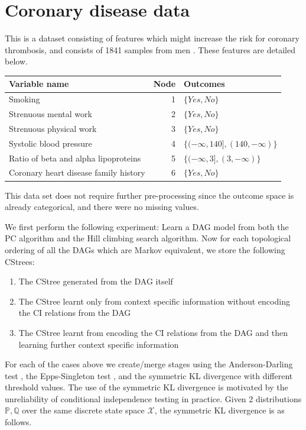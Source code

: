 \documentclass{tufte-book}
\begin{document}
 \newpage 
\section{Coronary disease data}
\label{sec:orgb663ff2}

This is a dataset consisting of features which might increase the risk for coronary thrombosis, and consists of 1841 samples from men \cite{reinis-1981-progn-signif}.  These features are detailed below.
\begin{center}
\begin{tabular}{l|r|l}
\hline
Variable name & Node & Outcomes\\
\hline
Smoking & 1 & \(\{ Yes,No \}\)\\
Strenuous mental work & 2 & \(\{ Yes,No \}\)\\
Strenuous physical work & 3 & \(\{ Yes,No \}\)\\
Systolic blood pressure & 4 & \(\{(-\infty,140],(140,-\infty)\}\)\\
Ratio of beta and alpha lipoproteins & 5 & \(\{(-\infty,3],(3,-\infty)\}\)\\
Coronary heart disease family history & 6 & \(\{ Yes,No \}\)\\
\end{tabular}
\end{center}


This data set does not require further pre-processing since the outcome space is already categorical, and there were no missing values.


We first perform the following experiment: Learn a DAG model from both the PC algorithm and the Hill climbing search algorithm. Now for each topological ordering of all the DAGs which are Markov equivalent, we store the following CStrees:
\begin{enumerate}
\item The CStree generated from the DAG itself
\item The CStree learnt only from context specific information without encoding the CI relations from the DAG
\item The CStree learnt from encoding the CI relations from the DAG and then learning further context specific information
\end{enumerate}

For each of the cases above we create/merge stages using the Anderson-Darling test \cite{scholz-1987-k-sampl}, the Epps-Singleton test \cite{epps-1986-omnib-test}, and the symmetric KL divergence with different threshold values. The use of the symmetric KL divergence is motivated by the unreliability of conditional independence testing in practice. Given 2 distributions \(\mathbb{P}, \mathbb{Q}\) over the same discrete state space \(\mathcal{X}\), the symmetric KL divergence is as follows. 
\end{document}

